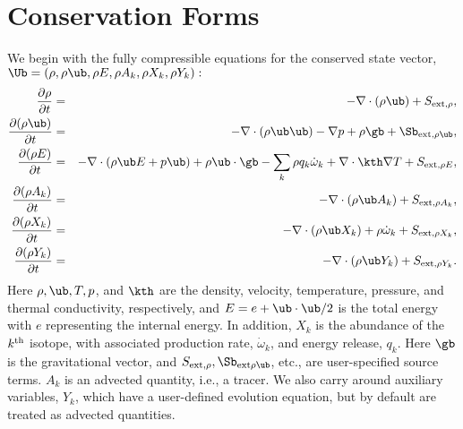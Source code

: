 \section{Conservation Forms}
We begin with the fully compressible equations for the conserved state vector, 
$\Ub = (\rho, \rho \ub, \rho E, \rho A_k, \rho X_k, \rho Y_k):$
\begin{eqnarray}
\frac{\partial \rho}{\partial t} &=& - \nabla \cdot (\rho \ub) + S_{{\rm ext},\rho}, \\
\frac{\partial (\rho \ub)}{\partial t} &=& - \nabla \cdot (\rho \ub \ub) - \nabla p +\rho \gb + \Sb_{{\rm ext},\rho\ub}, \\
\frac{\partial (\rho E)}{\partial t} &=& - \nabla \cdot (\rho \ub E + p \ub) + \rho \ub \cdot \gb - \sum_k {\rho q_k \dot\omega_k} + \nabla\cdot\kth\nabla T + S_{{\rm ext},\rho E}, \\
\frac{\partial (\rho A_k)}{\partial t} &=& - \nabla \cdot (\rho \ub A_k) + S_{{\rm ext},\rho A_k}, \\
\frac{\partial (\rho X_k)}{\partial t} &=& - \nabla \cdot (\rho \ub X_k) + \rho \dot\omega_k + S_{{\rm ext},\rho X_k}, \\
\frac{\partial (\rho Y_k)}{\partial t} &=& - \nabla \cdot (\rho \ub Y_k) + S_{{\rm ext},\rho Y_k}.\label{eq:compressible-equations}
\end{eqnarray}
Here $\rho, \ub, T, p$, and $\kth$ are the density, velocity,
temperature, pressure, and thermal conductivity, respectively, and $E
= e + \ub \cdot \ub / 2$ is the total energy with $e$ representing the
internal energy.  In addition, $X_k$ is the abundance of the $k^{\rm
  th}$ isotope, with associated production rate, $\dot\omega_k$, and
energy release, $q_k$.  Here $\gb$ is the gravitational vector, and
$S_{{\rm ext},\rho}, \Sb_{{\rm ext}\rho\ub}$, etc., are user-specified
source terms.  $A_k$ is an advected quantity, i.e., a tracer.  We also
carry around auxiliary variables, $Y_k$, which have a user-defined
evolution equation, but by default are treated as advected quantities.


